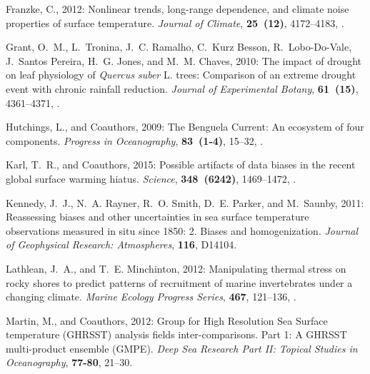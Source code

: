 \documentclass{ametsoc}
\begin{document}
\begin{thebibliography}{23}
Franzke, C., 2012: {Nonlinear trends, long-range dependence, and climate noise
  properties of surface temperature}. \textit{Journal of Climate},
  \textbf{25~(12)}, 4172--4183, .

Grant, O.~M., L.~Tronina, J.~C. Ramalho, C.~{Kurz Besson}, R.~Lobo-Do-Vale,
  J.~{Santos Pereira}, H.~G. Jones, and M.~M. Chaves, 2010: {The impact of
  drought on leaf physiology of \textit{Quercus suber} L. trees: Comparison of an
  extreme drought event with chronic rainfall reduction}. \textit{Journal of
  Experimental Botany}, \textbf{61~(15)}, 4361--4371, .


Hutchings, L., and Coauthors, 2009: {The Benguela Current: An ecosystem of four
  components}. \textit{Progress in Oceanography}, \textbf{83~(1-4)}, 15--32,
  .

Karl, T.~R., and Coauthors, 2015: {Possible artifacts of data biases in the
  recent global surface warming hiatus}. \textit{Science}, \textbf{348~(6242)},
  1469--1472, .

Kennedy, J.~J., N.~A. Rayner, R.~O. Smith, D.~E. Parker, and M.~Saunby, 2011: 
  {Reassessing biases and other uncertainties in sea surface temperature observations
  measured in situ since 1850: 2. Biases and homogenization}. \textit{Journal of 
  Geophysical Research: Atmospheres}, \textbf{116}, D14104.

Lathlean, J.~A., and T.~E. Minchinton, 2012: {Manipulating thermal stress on
  rocky shores to predict patterns of recruitment of marine invertebrates under
  a changing climate}. \textit{Marine Ecology Progress Series}, \textbf{467},
  121--136, .

Martin, M., and Coauthors, 2012: {Group for High Resolution Sea Surface
  temperature (GHRSST) analysis fields inter-comparisons. Part 1: A GHRSST
  multi-product ensemble (GMPE)}. \textit{Deep Sea Research Part II: Topical
  Studies in Oceanography}, \textbf{77-80}, 21--30.


\end{thebibliography}
\end{document}

